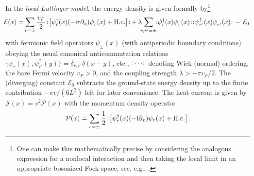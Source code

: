 \documentclass[12pt,a4paper]{article}
\newcommand{\ii}{{\rm i}}
\newcommand{\cE}{\mathcal{E}}
\newcommand{\cJ}{\mathcal{J}}
\newcommand{\cP}{\mathcal{P}}
\newcommand{\hc}{\mathrm{H.c.}}
\newcommand{\pdag}{^{\vphantom{\dagger}}}
\newcommand{\wick}[1]{\left. :\! \hspace{-0.5pt} #1 \hspace{-0.5pt} \!: \right.}
\theoremstyle{definition}
\theoremstyle{remark}
\begin{document}
In the {\it local Luttinger model}, the energy density is given
formally by\footnote{One can make this mathematically precise by considering
the analogous expression for a nonlocal interaction
and then taking the local limit \cite{ML} in an appropriate 
bosonized Fock space, see, e.g., \cite{LaMo}.}
%
\begin{equation} 
\label{cE}
\hspace*{-0.1cm}\cE(x)
= \hspace{-0.05cm}\sum_{r=\pm} \frac{v_F}{2}
		\! \wick{ \left[ \psi^\dag_r(x) (-\ii r\partial_x) \psi\pdag_r(x) +
    \hc \right] } \!
+\lambda\hspace{-0.14cm}\sum_{r,r'=\pm}\hspace{-0.18cm}
		\wick{ \psi^\dag_r(x)\psi\pdag_r(x) } \!
		\! \wick{ \psi^\dag_{r'}(x)\psi\pdag_{r'}(x)} \!
\,-\,\cE_0
\end{equation}
%
with fermionic field operators $\psi_{\pm}(x)$ (with antiperiodic boundary conditions) 
obeying the usual canonical anticommutation relations $\{\psi_r(x),\psi^\dag_{r'}(y)\} = \delta_{r,r'} \delta(x-y)$, etc., $\wick{\cdots}$ denoting Wick (normal) ordering, the bare Fermi velocity $v_F > 0$, and the coupling strength $\lambda > -\pi v_F/2$. The (diverging) constant $\cE_0$ subtracts the ground-state energy density
up to the finite contribution $-\pi v/(6L^2)$
left for later convenience.
The heat current is given by $\cJ(x)=v^2\cP(x)$ with the momentum density operator
%
\begin{equation} 
\label{momentumop}
\cP(x)
= \sum_{r=\pm} \frac{1}{2}
	\! \wick{ \left[ \psi^\dag_r(x) (-\ii\partial_x) \psi_r(x) + \hc \right] } \!
\end{equation}
%
%
\end{document}
